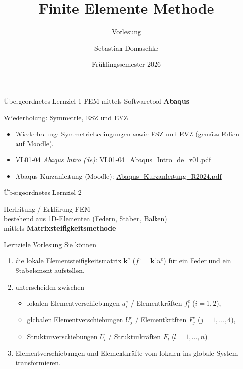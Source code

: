 \documentclass[aspectratio=169,professionalfonts]{beamer}
\title[FEM]{Finite Elemente Methode}
\subtitle{Vorlesung}
\author[ZHAW]{Sebastian Domaschke}
\institute[ZHAW]{Zürcher Hochschule für Angewandte Wissenschaften (ZHAW)}
\date{Frühlingssemester 2026}
\begin{document}
\begin{frame}
  \titlepage
\end{frame}



\begin{frame}{Übergeordnetes Lernziel 1}
  \centering
  {\LARGE FEM mittels Softwaretool \textbf{Abaqus}}
\end{frame}

\begin{frame}{Wiederholung: Symmetrie, ESZ und EVZ}
  \small
  \begin{itemize}
    \item Wiederholung: Symmetriebedingungen sowie ESZ und EVZ (gemäss Folien auf Moodle).
    \item VL01-04 \emph{Abaqus Intro (de)}:
      \href{https://moodle.zhaw.ch/pluginfile.php/121654/mod_resource/content/2/VL01-04_Abaqus_Intro_de_v01.pdf}{VL01-04\_Abaqus\_Intro\_de\_v01.pdf}
    \item Abaqus Kurzanleitung (Moodle):
      \href{https://moodle.zhaw.ch/pluginfile.php/121648/mod_resource/content/4/Abaqus_Kurzanleitung_R2024.pdf}{Abaqus\_Kurzanleitung\_R2024.pdf}
  \end{itemize}
\end{frame}

\begin{frame}{Übergeordnetes Lernziel 2}
  \centering
  \begin{minipage}{0.9\linewidth}
    \centering
    {\LARGE  Herleitung / Erklärung FEM\\[0.6em]}
    {\Large bestehend aus 1D-Elementen (Federn, Stäben, Balken)\\[0.4em]}
    {\Large mittels \textbf{Matrixsteifigkeitsmethode}}
  \end{minipage}
\end{frame}

\begin{frame}{Lernziele Vorlesung}
  \small
  Sie können
  \begin{enumerate}
    \item die lokale Elementsteifigkeitsmatrix $\mathbf{k}^e$ ($f^e=\mathbf{k}^eu^e$) für ein Feder und ein Stabelement aufstellen,
    \item unterscheiden zwischen
      \begin{itemize}
        \item lokalen Elementverschiebungen $u_i^e$ / Elementkräften $f_i^e$ ($i=1,2$),
        \item globalen Elementverschiebungen $U_j^e$ / Elementkräften $F_j^e$ ($j=1,\dots,4$),
        \item Strukturverschiebungen $U_l$ / Strukturkräften $F_l$ ($l=1,\dots,n$),
      \end{itemize}
    \item Elementverschiebungen und Elementkräfte vom lokalen ins globale System transformieren.
  \end{enumerate}
\end{frame}
\end{document}
